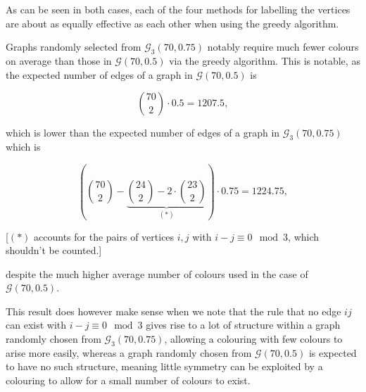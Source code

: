 \documentclass{article}
\begin{document}
\begin{center}
\end{center}


As can be seen in both cases, each of the four methods for labelling the vertices are about as equally effective as each other when using the greedy algorithm. %

Graphs randomly selected from $\mathcal{G}_3(70,0.75)$ notably require much fewer colours on average than those in $\mathcal{G}(70,0.5)$ via the greedy algorithm. This is notable, as the expected number of edges of a graph in $\mathcal{G}(70,0.5)$ is

$$\binom{70}{2} \cdot 0.5 = 1207.5,$$

which is lower than the expected number of edges of a graph in $\mathcal{G}_3(70,0.75)$ which is

$$\left(\binom{70}{2} - \underbrace{\binom{24}{2} - 2 \cdot \binom{23}{2}}_{(\ast)}\right) \cdot 0.75 = 1224.75,$$

[$(\ast)$ accounts for the pairs of vertices $i,j$ with $i-j \equiv 0 \mod 3$, which shouldn't be counted.]

despite the much higher average number of colours used in the case of $\mathcal{G}(70,0.5)$.

This result does however make sense when we note that the rule that no edge $ij$ can exist with $i-j \equiv 0 \mod 3$ gives rise to a lot of structure within a graph randomly chosen from $\mathcal{G}_3(70,0.75)$, allowing a colouring with few colours to arise more easily, whereas a graph randomly chosen from $\mathcal{G}(70,0.5)$ is expected to have no such structure, meaning little symmetry can be exploited by a colouring to allow for a small number of colours to exist.
\end{document}
